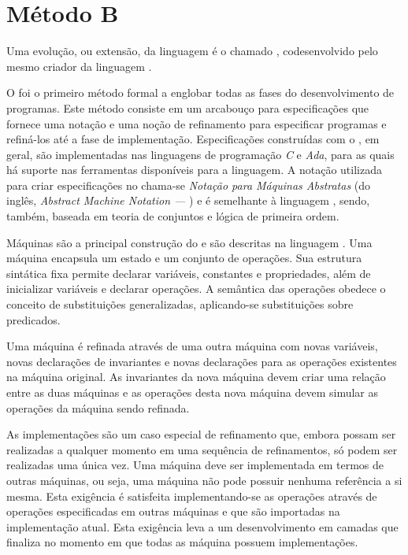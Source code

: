 
\section{Método B}
Uma evolução, ou extensão, da linguagem \Z é o chamado \BMethod\cite{BMethod}, codesenvolvido pelo mesmo criador da linguagem \Z.

O \BMethod foi o primeiro método formal a englobar todas as fases do desenvolvimento de programas.
Este método consiste em um arcabouço para especificações que fornece uma notação e uma noção de refinamento para especificar programas e refiná-los até a fase de implementação.
Especificações construídas com o \BMethod, em geral, são implementadas nas linguagens de programação \textit{C} e \textit{Ada}, para as quais há suporte nas ferramentas disponíveis para a linguagem.
A notação utilizada para criar especificações no \BMethod chama-se \textit{Notação para Máquinas Abstratas} (do inglês, \textit{Abstract Machine Notation --- \AMN}) e é semelhante à linguagem \Z, sendo, também, baseada em teoria de conjuntos e lógica de primeira ordem.

Máquinas são a principal construção do \BMethod e são descritas na linguagem \AMN.
Uma máquina encapsula um estado e um conjunto de operações.
Sua estrutura sintática fixa permite declarar variáveis, constantes e propriedades, além de inicializar variáveis e declarar operações.
A semântica das operações obedece o conceito de substituições generalizadas, aplicando-se substituições sobre predicados.

Uma máquina é refinada através de uma outra máquina com novas variáveis, novas declarações de invariantes e novas declarações para as operações existentes na máquina original.
As invariantes da nova máquina devem criar uma relação entre as duas máquinas e as operações desta nova máquina devem simular as operações da máquina sendo refinada.

As implementações são um caso especial de refinamento que, embora possam ser realizadas a qualquer momento em uma sequência de refinamentos, só podem ser realizadas uma única vez.
Uma máquina deve ser implementada em termos de outras máquinas, ou seja, uma máquina não pode possuir nenhuma referência a si mesma.
Esta exigência é satisfeita implementando-se as operações através de operações especificadas em outras máquinas e que são importadas na implementação atual.
Esta exigência leva a um desenvolvimento em camadas que finaliza no momento em que todas as máquina possuem implementações.


